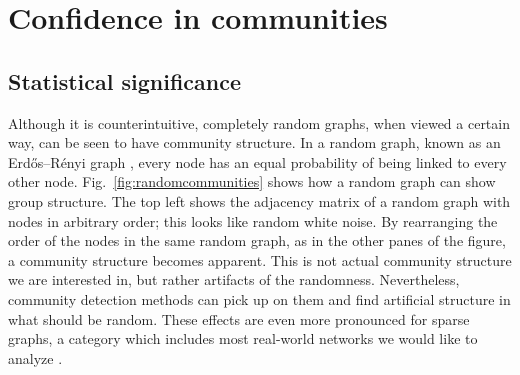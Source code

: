 \hypertarget{confidence-in-communities}{\section{Confidence in
communities}\label{confidence-in-communities}}

\protect\hyperlink{confidence-in-communities}{}

\subsection{Statistical significance}\label{statistical-significance}

Although it is counterintuitive, completely random graphs, when viewed a
certain way, can be seen to have community structure. In a random graph,
known as an Erdős--Rényi graph \autocite{erdos_evolution_1960}, every
node has an equal probability of being linked to every other node.
Fig.~\ref{fig:randomcommunities} shows how a random graph can show group
structure. The top left shows the adjacency matrix of a random graph
with nodes in arbitrary order; this looks like random white noise. By
rearranging the order of the nodes in the same random graph, as in the
other panes of the figure, a community structure becomes apparent. This
is not actual community structure we are interested in, but rather
artifacts of the randomness. Nevertheless, community detection methods
can pick up on them and find artificial structure in what should be
random. These effects are even more pronounced for sparse graphs, a
category which includes most real-world networks we would like to
analyze \autocite{fortunato_community_2016}.

